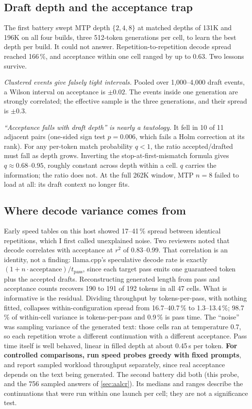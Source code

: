 \subsection{Draft depth and the acceptance trap}
The first battery swept MTP depth $\{2,4,8\}$ at matched depths of 131K and 196K on all four builds,
three 512-token generations per cell, to learn the best depth per build. It could not answer.
Repetition-to-repetition decode spread reached 166\,\%, and acceptance within one cell ranged by up to
0.63. Two lessons survive.

\emph{Clustered events give falsely tight intervals.} Pooled over 1{,}000--4{,}000 draft events, a
Wilson interval on acceptance is $\pm0.02$. The events inside one generation are strongly correlated;
the effective sample is the three generations, and their spread is $\pm0.3$.

\emph{``Acceptance falls with draft depth'' is nearly a tautology.} It fell in 10 of 11 adjacent pairs
(one-sided sign test $p=0.006$, which fails a Holm correction at its rank). For any per-token match
probability $q<1$, the ratio accepted/drafted must fall as depth grows. Inverting the
stop-at-first-mismatch formula gives $q\approx0.68$--$0.95$, roughly constant across depth within a
cell. $q$ carries the information; the ratio does not. At the full 262K window, MTP $n{=}8$ failed to
load at all: its draft context no longer fits.

\subsection{Where decode variance comes from}\label{sec:variance}
Early speed tables on this host showed 17--41\,\% spread between identical repetitions, which I first
called unexplained noise. Two reviewers noted that decode correlates with acceptance at $r^2$ of
0.83--0.99. That correlation is an identity, not a finding: llama.cpp's speculative decode rate is
exactly $(1+n\cdot\text{acceptance})/t_\text{pass}$, since each target pass emits one guaranteed token
plus the accepted drafts. Reconstructing generated length from pass and acceptance counts recovers 190
to 191 of 192 tokens in all 47 cells. What is informative is the residual. Dividing throughput by
tokens-per-pass, with nothing fitted, collapses within-configuration spread from 16.7--40.7\,\% to
1.3--13.4\,\%; 98.7\,\% of within-cell variance is tokens-per-pass and 0.9\,\% is pass time. The
``noise'' was sampling variance of the generated text: those cells ran at temperature 0.7, so each
repetition wrote a different continuation with a different acceptance. Pass time itself is well
behaved, linear in filled depth at about 0.45\,\textmu s per token. \textbf{For controlled comparisons, run speed probes greedy with fixed prompts}, and report sampled
workload throughput separately, since real acceptance depends on the text being generated. The second
battery did both (this probe, and the 756 sampled answers of \cref{sec:aalcr}). Its medians and ranges
describe the continuations that were run within one launch per cell; they are not a significance test.
